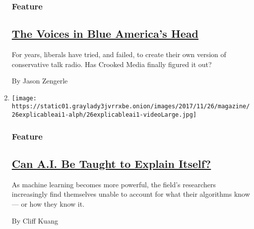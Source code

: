 \begin{enumerate}
  \hypertarget{feature-2}{%
  \subsubsection{Feature}\label{feature-2}}

  \hypertarget{the-voices-in-blue-americas-head}{%
  \subsection{\texorpdfstring{\href{/2017/11/22/magazine/the-voices-in-blue-americas-head.html}{The
  Voices in Blue America's
  Head}}{The Voices in Blue America's Head}}\label{the-voices-in-blue-americas-head}}

  For years, liberals have tried, and failed, to create their own
  version of conservative talk radio. Has Crooked Media finally figured
  it out?

  By Jason Zengerle
\item
  \texttt{[image: https://static01.graylady3jvrrxbe.onion/images/2017/11/26/magazine/26explicableai1-alph/26explicableai1-videoLarge.jpg]}

  \hypertarget{feature-3}{%
  \subsubsection{Feature}\label{feature-3}}

  \hypertarget{can-ai-be-taught-to-explain-itself}{%
  \subsection{\texorpdfstring{\href{/2017/11/21/magazine/can-ai-be-taught-to-explain-itself.html}{Can
  A.I. Be Taught to Explain
  Itself?}}{Can A.I. Be Taught to Explain Itself?}}\label{can-ai-be-taught-to-explain-itself}}

  As machine learning becomes more powerful, the field's researchers
  increasingly find themselves unable to account for what their
  algorithms know --- or how they know it.

  By Cliff Kuang
\end{enumerate}

